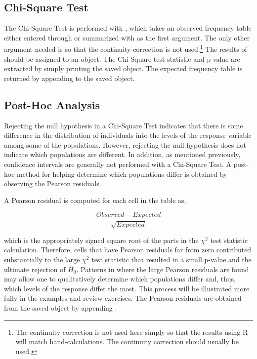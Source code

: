 \documentclass[10pt,openany]{book}\usepackage[]{graphicx}\usepackage[]{color}
\begin{document}
\subsection{Chi-Square Test}
\vspace{-12pt}
The Chi-Square Test is performed with , which takes an observed frequency table either entered through  or summarized with  as the first argument.  The only other argument needed is  so that the continuity correction is not used.\footnote{The continuity correction is not used here simply so that the results using R will match hand-calculations. The continuity correction should usually be used.} The results of  should be assigned to an object. The Chi-Square test statistic and p-value are extracted by simply printing the saved object. The expected frequency table is returned by appending  to the saved object.

\subsection{Post-Hoc Analysis}
\vspace{-12pt}
Rejecting the null hypothesis in a Chi-Square Test indicates that there is some difference in the distribution of individuals into the levels of the response variable among some of the populations.  However, rejecting the null hypothesis does not indicate which populations are different.  In addition, as mentioned previously, confidence intervals are generally not performed with a Chi-Square Test.  A post-hoc method for helping determine which populations differ is obtained by observing the Pearson residuals.

A Pearson residual is computed for each cell in the table as,

\[ \frac{Observed-Expected}{\sqrt{Expected}} \]

which is the appropriately signed square root of the parts in the $\chi^2$ test statistic calculation.  Therefore, cells that have Pearson residuals far from zero contributed substantially to the large $\chi^2$ test statistic that resulted in a small p-value and the ultimate rejection of $H_{0}$.  Patterns in where the large Pearson residuals are found may allow one to qualitatively determine which populations differ and, thus, which levels of the response differ the most.  This process will be illustrated more fully in the examples and review exercises.  The Pearson residuals are obtained from the saved  object by appending .
\end{document}
